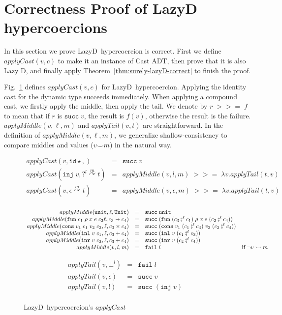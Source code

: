\documentclass[acmsmall,review,anonymous]{acmart}\settopmatter{printfolios=true,printccs=false,printacmref=false}
\newcommand{\figref}[1]{Fig.~\ref{#1}}
\newcommand{\funrule}[3]{#1 &=& #2 & #3\\}
\newcommand{\plus}[0]{+}
\newcommand{\lazyD}{Lazy\;D}
\newcommand{\POOunit}[0]{\mathtt{Unit}}
\newcommand{\POOfun}[2]{#1 \shortrightarrow #2}
\newcommand{\POOprod}[2]{#1 \times #2}
\newcommand{\POOsum}[2]{#1 \plus #2}
\newcommand{\rOOsucc}[1]{\mathtt{succ}\;#1}
\newcommand{\rOOfail}[1]{\mathtt{fail}\;#1}
\newcommand{\hcvOOinj}[2]{\mathtt{inj} \; #2}
\newcommand{\hcvOOfun}[5]{\mathtt{fun} \; #1 \; #2 \; #3 \; #4 \; #5}
\newcommand{\hcvOOtt}[0]{\mathtt{unit}}
\newcommand{\hcvOOcons}[4]{\mathtt{cons}\;#1\;#2\;#3\;#4}
\newcommand{\hcvOOinl}[2]{\mathtt{inl}\;#1\;#2}
\newcommand{\hcvOOinr}[2]{\mathtt{inr}\;#1\;#2}
\newcommand{\sidecond}[1]{\text{if}\;#1}
\newcommand{\hyperCoercionI}[0]{\mathtt{id\star}}
\newcommand{\hyperCoercionC}[3]{#1 \overset{#2}{\curvearrowright} #3}
\begin{document}
\section{Correctness Proof of \lazyD{} hypercoercions}
\label{sec:hypercoercion-correctness}

In this section we prove \lazyD\ hypercoercion is 
correct. First we define $ applyCast(v,c) $ to make it an instance of Cast ADT, 
then prove that it is also Lazy D, and finally apply 
Theorem~\ref{thm:surely-lazyD-correct} to finish the proof.

\figref{hc-applyCast} defines $ applyCast(v,c) $ for \lazyD\ hypercoercion. 
Applying the identity cast for the 
dynamic type succeeds immediately. When applying a compound cast, we firstly 
apply the middle, then apply the tail. We denote by $ r \; >>= \; f $ to mean 
that if $ r $ is $ \rOOsucc{v} $, the result is $ f(v) $, otherwise the result 
is the failure.
$ applyMiddle(v,\ell,m) $ and $ applyTail(v,t) $ are straightforward.
In the definition of $ applyMiddle(v,\ell,m) $, we generalize 
shallow-consistency to compare middles and values ($ v \smile m $) in the 
natural way.

\begin{figure}
	\[
	\begin{array}{rclr}
	\funrule{applyCast(v,\hyperCoercionI,)}{\rOOsucc{v}}{}
	\funrule{applyCast(\hcvOOinj{P}{v},\hyperCoercionC{?^l}{m}{t})}{
		applyMiddle(v,l,m) \; >>= \; \lambda v. applyTail(t,v)
	}{}
	\funrule{applyCast(v,\hyperCoercionC{\epsilon}{m}{t})}{
		applyMiddle(v,\epsilon,m) \; >>= \; \lambda v. applyTail(t,v)
	}{}
	\end{array}
	\]
	
	\[
	\begin{array}{rclr}
	\funrule{applyMiddle(\hcvOOtt,\ell,\POOunit)}{\rOOsucc{\hcvOOtt}}{}
	\funrule{applyMiddle(\hcvOOfun{c_1}{\rho}{x}{e}{c_2}\ell,\POOfun{c_3}{c_4})}{
		\rOOsucc{(\hcvOOfun{(c_3 \fatsemi^\ell c_1)}{\rho}{x}{e}{(c_2 
		\fatsemi^\ell c_4)})}
	}{}
	\funrule{applyMiddle(\hcvOOcons{v_1}{c_1}{v_2}{c_2},\ell,\POOprod{c_3}{c_4})}{
		\rOOsucc{(\hcvOOcons{v_1}{(c_1 \fatsemi^\ell c_3)}{v_2}{(c_2 
		\fatsemi^\ell c_4)})}
	}{}
	\funrule{applyMiddle(\hcvOOinl{v}{c_1},\ell,\POOsum{c_3}{c_4})}{
		\rOOsucc{(\hcvOOinl{v}{(c_1 \fatsemi^\ell c_3)})}
	}{}
	\funrule{applyMiddle(\hcvOOinr{v}{c_2},\ell,\POOsum{c_3}{c_4})}{
		\rOOsucc{(\hcvOOinr{v}{(c_2 \fatsemi^\ell c_4)})}
	}{}
	\funrule{applyMiddle(v,l,m)}{
		\rOOfail{l}
	}{
		\sidecond{\neg v \smile m}
	}
	\end{array}
	\]
	
	\[
	\begin{array}{rclr}
	\funrule{applyTail(v,\bot^l)}{\rOOfail{l}}{}
	\funrule{applyTail(v,\epsilon)}{\rOOsucc{v}}{}
	\funrule{applyTail(v,!)}{\rOOsucc{(\hcvOOinj{P}{v})}}{}
	\end{array}
	\]
	\caption{\lazyD\ hypercoercion's $ applyCast $}
	\label{hc-applyCast}
\end{figure}
\end{document}
